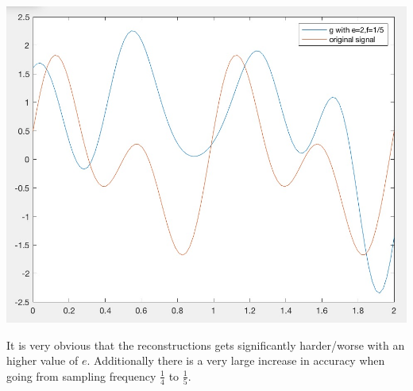 \documentclass[12pt]{article}
\begin{document}
\begin{enumerate}[a)]
\begin{centering}
        \includegraphics[scale = 0.3]{figures/e20-f15}\\
        \end{centering}

        It is very obvious that the reconstructions gets significantly harder/worse with an higher value of $e$. Additionally there is a very large increase in accuracy when going from sampling frequency $\frac{1}{4}$ to $\frac{1}{5}$.


\end{enumerate}
\end{document}
